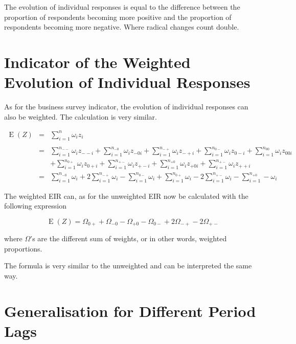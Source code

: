 \documentclass[12pt,a4paper,oneside]{book}
\DeclareMathOperator{\E}{E}
\begin{document}
The evolution of individual responses is equal to the difference between the proportion of respondents becoming more positive and the proportion of respondents becoming more negative. Where radical changes count double.



\section{Indicator of the Weighted Evolution of Individual Responses}

As for the business survey indicator, the evolution of individual responses can also be weighted. The calculation is very similar.

\begin{eqnarray}
    \E(Z) &=&  \sum_{i=1}^n \omega_i z_i \\ \nonumber \\
        &=& \sum_{i=1}^{n_{--}} \omega_i z_{--i} 
     + \sum_{i=1}^{n_{-0}} \omega_i z_{-0i}  
    + \sum_{i=1}^{n_{-+}} \omega_i z_{-+i} 
    + \sum_{i=1}^{n_{0-}} \omega_i z_{0-i}  
    + \sum_{i=1}^{n_{00}} \omega_i z_{00i}   \nonumber  \\
    &&  + \sum_{i=1}^{n_{0+}} \omega_i z_{0+i} 
    + \sum_{i=1}^{n_{+-}} \omega_i z_{+-i} 
    + \sum_{i=1}^{n_{+0}} \omega_i z_{+0i} 
    + \sum_{i=1}^{n_{+-}} \omega_i z_{++i} \\
&=&  \sum_{i=1}^{n_{-0}} \omega_i  
    + 2 \sum_{i=1}^{n_{-+}} \omega_i  
    - \sum_{i=1}^{n_{0-}} \omega_i         
    + \sum_{i=1}^{n_{0+}} \omega_i  
    - 2 \sum_{i=1}^{n_{+-}} \omega_i 
    - \sum_{i=1}^{n_{+0}} - \omega_i  
\end{eqnarray}


The weighted EIR can, as for the unweighted EIR now be calculated with the following expression 

\begin{equation}
    \E(Z) = \Omega_{0+} + \Omega_{-0} - \Omega_{+0} - \Omega_{0-} +2\Omega_{-+} -2\Omega_{+-} \label{eq:weighted proprotion EIR}
\end{equation}

where $\Omega$'s are the different sum of weights, or in other words, weighted proportions.

The formula is very similar to the unweighted and can be interpreted the same way.


\section{Generalisation for Different Period Lags}
\end{document}
